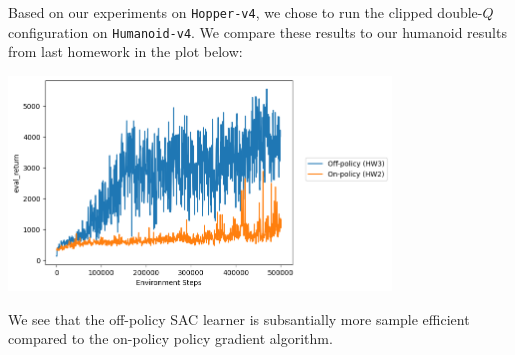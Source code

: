 \begin{itemize}
    \begin{sol}
        Based on our experiments on \texttt{Hopper-v4}, we chose to run the clipped double-$Q$ configuration on \texttt{Humanoid-v4}. We compare these results to our humanoid results from last homework in the plot below:
        \begin{center}
            \includegraphics[width=4in]{../q3.1.5_humanoid.png}
        \end{center} 
        We see that the off-policy SAC learner is subsantially more sample efficient compared to the on-policy policy gradient algorithm. 
    \end{sol}
\end{itemize}